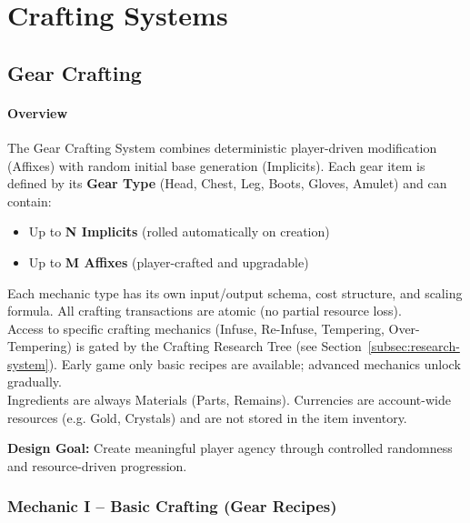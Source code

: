 \section{Crafting Systems}


\subsection{Gear Crafting}

\paragraph{Overview}
The Gear Crafting System combines deterministic player-driven modification (Affixes) with random initial base generation (Implicits). 
Each gear item is defined by its \textbf{Gear Type} (Head, Chest, Leg, Boots, Gloves, Amulet) and can contain:
\begin{itemize}
	\item Up to \textbf{N Implicits} (rolled automatically on creation)
	\item Up to \textbf{M Affixes} (player-crafted and upgradable)\\
\end{itemize}

Each mechanic type has its own input/output schema, cost structure, and scaling formula.
All crafting transactions are atomic (no partial resource loss).\\
Access to specific crafting mechanics (Infuse, Re-Infuse, Tempering, Over-Tempering) is gated by the Crafting Research Tree (see Section~\ref{subsec:research-system}).
Early game only basic recipes are available; advanced mechanics unlock gradually.\\

Ingredients are always Materials (Parts, Remains). 
Currencies are account-wide resources (e.g. Gold, Crystals) and are not stored in the item inventory.

\vspace{0.5em}
\noindent
\textbf{Design Goal:} Create meaningful player agency through controlled randomness and resource-driven progression.
\vspace{1em}

\subsubsection{Mechanic I – Basic Crafting (Gear Recipes)}

